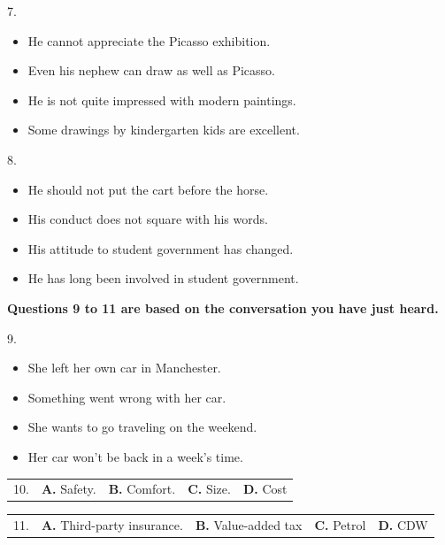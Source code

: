 \documentclass[UTF8,11pt]{ctexart}
\begin{document}
7.


\begin{itemize}[leftmargin=2em,itemsep=.2em,topsep=.4em]\item[A.] He cannot appreciate the Picasso exhibition.
\item[B.] Even his nephew can draw as well as Picasso.
\item[C.] He is not quite impressed with modern paintings.
\item[D.] Some drawings by kindergarten kids are excellent.
\end{itemize}

8.


\begin{itemize}[leftmargin=2em,itemsep=.2em,topsep=.4em]\item[A.] He should not put the cart before the horse.
\item[B.] His conduct does not square with his words.
\item[C.] His attitude to student government has changed.
\item[D.] He has long been involved in student government.
\end{itemize}

\textbf{Questions 9 to 11 are based on the conversation you have just heard.}


9.


\begin{itemize}[leftmargin=2em,itemsep=.2em,topsep=.4em]\item[A.] She left her own car in Manchester.
\item[B.] Something went wrong with her car.
\item[C.] She wants to go traveling on the weekend.
\item[D.] Her car won’t be back in a week’s time.
\end{itemize}

\noindent\begin{tabularx}{\linewidth}{@{}lXXXX@{}}10. & \textbf{A.} Safety. & \textbf{B.} Comfort. & \textbf{C.} Size. & \textbf{D.} Cost\\\end{tabularx}\par

\noindent\begin{tabularx}{\linewidth}{@{}lXXXX@{}}11. & \textbf{A.} Third-party insurance. & \textbf{B.} Value-added tax & \textbf{C.} Petrol & \textbf{D.} CDW\\\end{tabularx}\par
\end{document}
